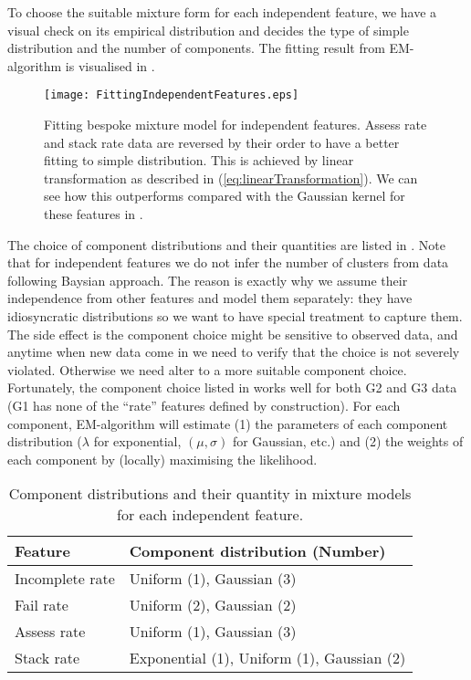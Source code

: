 To choose the suitable mixture form for each independent feature, we have a visual check on its empirical distribution and decides the type of simple distribution and the number of components. The fitting result from EM-algorithm is visualised in .

\begin{figure}[!h]
\centering
\texttt{[image: FittingIndependentFeatures.eps]}
\caption{Fitting bespoke mixture model for independent features. Assess rate and stack rate data are reversed by their order to have a better fitting to simple distribution. This is achieved by linear transformation as described in (\ref{eq:linearTransformation}). We can see how this outperforms compared with the Gaussian kernel for these features in . }
\label{fig:fitIndependentFeature}
\end{figure}

The choice of component distributions and their quantities are listed in . Note that for independent features we do not infer the number of clusters from data following Baysian approach. The reason is exactly why we assume their independence from other features and model them separately: they have idiosyncratic distributions so we want to have special treatment to capture them. The side effect is the component choice might be sensitive to observed data, and anytime when new data come in we need to verify that the choice is not severely violated. Otherwise we need alter to a more suitable component choice. Fortunately, the component choice listed in  works well for both G2 and G3 data (G1 has none of the ``rate'' features defined by construction). For each component, EM-algorithm will estimate (1) the parameters of each component distribution ($\lambda$ for exponential, $(\mu, \sigma)$ for Gaussian, etc.) and (2) the weights of each component by (locally) maximising the likelihood.

\begin{table}[!h]
\centering
\footnotesize
\begin{tabular}{p{3cm}|p{7cm}}
\hline
\textbf{Feature} & \textbf{Component distribution (Number)} \\
\hline
Incomplete rate &
Uniform (1), Gaussian (3) \\
\hline
Fail rate &
Uniform (2), Gaussian (2) \\
\hline
Assess rate &
Uniform (1), Gaussian (3) \\
\hline
Stack rate &
Exponential (1), Uniform (1), Gaussian (2) \\
\hline
\end{tabular}
\caption{Component distributions and their quantity in mixture models for each independent feature.}
\label{tab:fitIndependentFeature}
\end{table}

